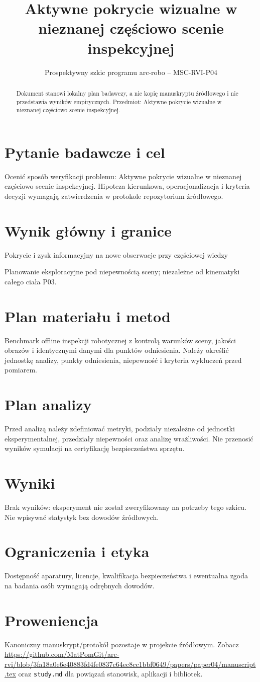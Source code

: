 \documentclass[11pt,a4paper]{article}
\title{Aktywne pokrycie wizualne w nieznanej częściowo scenie inspekcyjnej}
\author{}
\date{Prospektywny szkic programu arc-robo -- MSC-RVI-P04}
\begin{document}
\maketitle
\begin{abstract}
Dokument stanowi lokalny plan badawczy, a nie kopię manuskryptu źródłowego i nie przedstawia wyników empirycznych. Przedmiot: Aktywne pokrycie wizualne w nieznanej częściowo scenie inspekcyjnej.
\end{abstract}
\section{Pytanie badawcze i cel}
Ocenić sposób weryfikacji problemu: Aktywne pokrycie wizualne w nieznanej częściowo scenie inspekcyjnej. Hipoteza kierunkowa, operacjonalizacja i kryteria decyzji wymagają zatwierdzenia w protokole repozytorium źródłowego.
\section{Wynik główny i granice}
Pokrycie i zysk informacyjny na nowe obserwacje przy częściowej wiedzy

Planowanie eksploracyjne pod niepewnością sceny; niezależne od kinematyki całego ciała P03.
\section{Plan materiału i metod}
Benchmark offline inspekcji robotycznej z kontrolą warunków sceny, jakości obrazów i identycznymi danymi dla punktów odniesienia. Należy określić jednostkę analizy, punkty odniesienia, niepewność i kryteria wykluczeń przed pomiarem.
\section{Plan analizy}
Przed analizą należy zdefiniować metryki, podziały niezależne od jednostki eksperymentalnej, przedziały niepewności oraz analizę wrażliwości. Nie przenosić wyników symulacji na certyfikację bezpieczeństwa sprzętu.
\section{Wyniki}
Brak wyników: eksperyment nie został zweryfikowany na potrzeby tego szkicu. Nie wpisywać statystyk bez dowodów źródłowych.
\section{Ograniczenia i etyka}
Dostępność aparatury, licencje, kwalifikacja bezpieczeństwa i ewentualna zgoda na badania osób wymagają odrębnych dowodów.
\section{Proweniencja}
Kanoniczny manuskrypt/protokół pozostaje w projekcie źródłowym. Zobacz \url{https://github.com/MatPomGit/arc-rvi/blob/3fa18a0e6e40883fd4fe0837c64ec8cc1bbf0649/papers/paper04/manuscript.tex} oraz \texttt{study.md} dla powiązań stanowisk, aplikacji i bibliotek.
\end{document}
